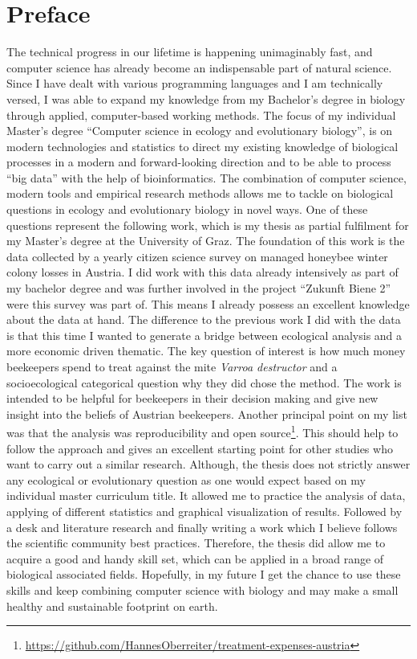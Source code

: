 \chapter*{Preface}
\label{sec:Preface}
\vspace*{-10mm}

The technical progress in our lifetime is happening unimaginably fast, and computer science has already become an indispensable part of natural science. Since I have dealt with various programming languages and I am technically versed, I was able to expand my knowledge from my Bachelor's degree in biology through applied, computer-based working methods. The focus of my individual Master's degree \enquote{Computer science in ecology and evolutionary biology}, is on modern technologies and statistics to direct my existing knowledge of biological processes in a modern and forward-looking direction and to be able to process \enquote{big data} with the help of bioinformatics. The combination of computer science, modern tools and empirical research methods allows me to tackle on biological questions in ecology and evolutionary biology in novel ways. One of these questions represent the following work, which is my thesis as partial fulfilment for my Master's degree at the University of Graz. The foundation of this work is the data collected by a yearly citizen science survey on managed honeybee winter colony losses in Austria. I did work with this data already intensively as part of my bachelor degree and was further involved in the project \enquote{Zukunft Biene 2} were this survey was part of. This means I already possess an excellent knowledge about the data at hand. The difference to the previous work I did with the data is that this time I wanted to generate a bridge between ecological analysis and a more economic driven thematic. The key question of interest is how much money beekeepers spend to treat against the mite \textit{Varroa destructor} and a socioecological categorical question why they did chose the method. The work is intended to be helpful for beekeepers in their decision making and give new insight into the beliefs of Austrian beekeepers. Another principal point on my list was that the analysis was reproducibility and open source\footnote{\url{https://github.com/HannesOberreiter/treatment-expenses-austria}}. This should help to follow the approach and gives an excellent starting point for other studies who want to carry out a similar research. Although, the thesis does not strictly answer any ecological or evolutionary question as one would expect based on my individual master curriculum title. It allowed me to practice the analysis of data, applying of different statistics and graphical visualization of results. Followed by a desk and literature research and finally writing a work which I believe follows the scientific community best practices. Therefore, the thesis did allow me to acquire a good and handy skill set, which can be applied in a broad range of biological associated fields. Hopefully, in my future I get the chance to use these skills and keep combining computer science with biology and may make a small healthy and sustainable footprint on earth.